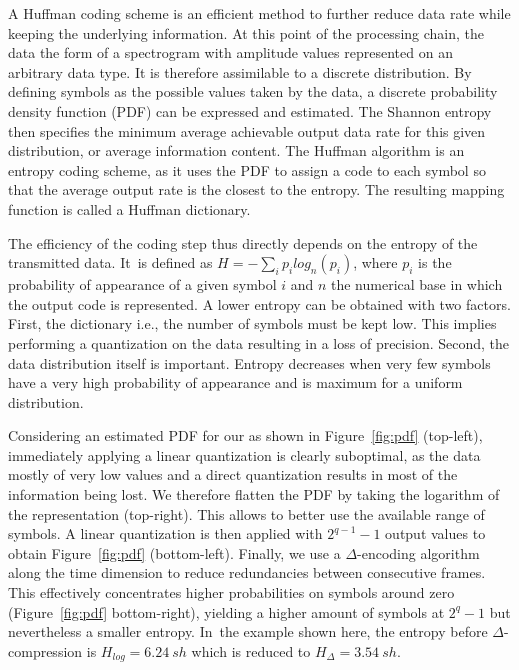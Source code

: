 \documentclass[sensors,article,accept,moreauthors,pdftex,10pt,a4paper]{mdpi}
\begin{document}
A Huffman coding scheme \cite{huffman1952} is an efficient method to further reduce data rate while keeping the underlying information. At this point of the processing chain, the data  the form of a spectrogram with amplitude values represented on an arbitrary data type. It is therefore assimilable to a discrete distribution. By defining symbols as the possible values taken by the data, a discrete probability density function (PDF) can be expressed and estimated. The Shannon entropy then specifies the minimum average achievable output data rate for this given distribution, or average information content. The Huffman algorithm is an entropy coding scheme, as it uses the PDF to assign a code to each symbol so that the average output rate is the closest to the entropy. The resulting mapping function is called a Huffman dictionary.

The efficiency of the coding step thus directly depends on the entropy of the transmitted data. It~is defined as $H = -\sum\limits_i p_ilog_n(p_i)$, where $p_i$ is the probability of appearance of a given symbol $i$ and $n$  the numerical base in which the output code is represented. A lower entropy can be obtained with two factors. First, the dictionary  i.e., the number of symbols must be kept low. This implies performing a quantization on the data resulting in a loss of precision. Second, the data distribution itself is important. Entropy decreases when very few symbols have a very high probability of appearance and is maximum for a uniform distribution.

Considering an estimated PDF for our  as shown in Figure~\ref{fig:pdf} (top-left), immediately applying a linear quantization is clearly suboptimal, as the data mostly  of very low values and a direct quantization results in most of the information being lost. We therefore flatten the PDF by taking the logarithm of the representation (top-right). This allows to better use the available range of symbols. A linear quantization is then applied with $2^{q-1}-1$ output values to obtain Figure~\ref{fig:pdf} (bottom-left). Finally, we use a $\Delta$-encoding algorithm along the time dimension to reduce redundancies between consecutive frames. This effectively concentrates higher probabilities on symbols around zero (Figure~\ref{fig:pdf} bottom-right), yielding a higher amount of symbols at $2^q-1$ but nevertheless a smaller entropy. In~the example shown here, the entropy before $\Delta$-compression is $H_{log} = 6.24~sh$ which is reduced to $H_{\Delta} = 3.54~sh$.
\vspace{-6pt}
\end{document}
